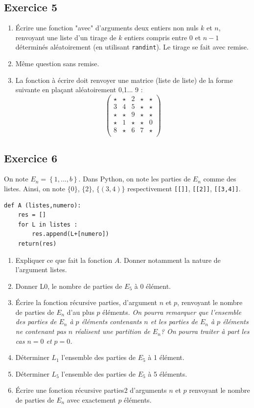 \documentclass[10pt,fleqn]{article} %
\begin{document}
\begin{multicols}{2}
\subsection*{Exercice 5}
\begin{enumerate}
\item Écrire une fonction "avec" d'arguments deux entiers non nuls $k$ et $n$, renvoyant une liste d'un tirage de $k$ entiers compris entre $0$ et $n-1$ déterminés aléatoirement (en utilisant \texttt{randint}). Le tirage se fait avec remise.
\item Même question sans remise.
\item La fonction à écrire doit renvoyer une matrice (liste de liste) de la forme suivante en plaçant aléatoirement 0,1... 9 :
$$
\begin{pmatrix}
\star & \star & 2& \star & \star \\
3 & 4 & 5 & \star & \star \\
\star & \star & 9 & \star & \star \\
\star & 1 & \star & \star & 0 \\
8 & \star & 6 & 7 & \star \\
\end{pmatrix}
$$
\end{enumerate}

\subsection*{Exercice 6}
On note $E_n=\left\{1,...,b\right\}$. Dans Python, on note les parties de $E_n$ comme des listes. Ainsi, on note $\{0 \}$, $\{ 2\}$, $\{(3,4) \}$ respectivement \texttt{[[]]}, \texttt{[[2]]}, \texttt{[[3,4]]}.   

\begin{lstlisting}
def A (listes,numero):
    res = []
    for L in listes :
        res.append(L+[numero])
    return(res)
\end{lstlisting}
\begin{enumerate}
\item Expliquer ce que fait la fonction $A$. Donner notamment la nature de l'argument listes. 
\item Donner L0, le nombre de parties de $E_5$ à 0 élément.
\item Écrire la fonction récursive parties, d'argument $n$ et $p$, renvoyant le nombre de parties de $E_n$ d'au plus $p$ éléments.  \textit{On pourra remarquer que l'ensemble des parties de $E_n$ à $p$ éléments contenants $n$ et les parties de $E_n$ à $p$ éléments ne contenant pas $n$ réalisent une partition de $E_n$? On pourra traiter à part les cas $n=0$ et $p=0$.}
\item Déterminer $L_1$ l'ensemble des parties de $E_5$ à 1 élément.
\item Déterminer $L_5$ l'ensemble des parties de $E_5$ à 5 éléments.
\item Écrire une fonction récursive parties2 d'arguments $n$ et $p$ renvoyant le nombre de parties de $E_n$ avec exactement $p$ éléments.
\end{enumerate}


\end{multicols}
\end{document}
